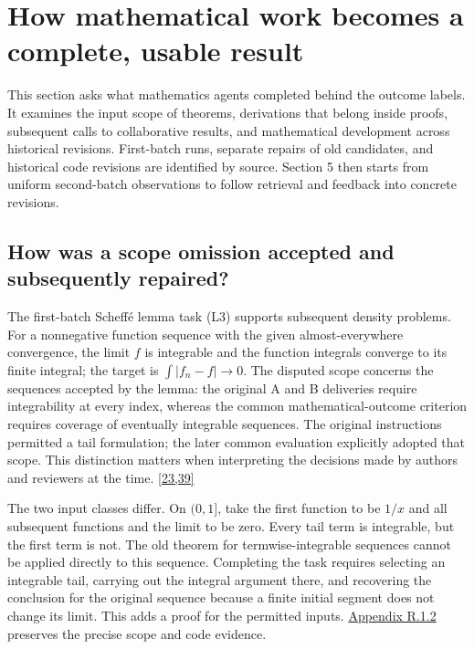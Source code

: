 \section[How mathematical work becomes a complete, usable result]{\texorpdfstring{\protect\hypertarget{section-4}{}How mathematical work becomes a complete, usable result}{How mathematical work becomes a complete, usable result}}
This section asks what mathematics agents completed behind the outcome labels. It examines the input scope of theorems, derivations that belong inside proofs, subsequent calls to collaborative results, and mathematical development across historical revisions. First-batch runs, separate repairs of old candidates, and historical code revisions are identified by source. Section 5 then starts from uniform second-batch observations to follow retrieval and feedback into concrete revisions.

\subsection[How was a scope omission accepted and subsequently repaired?]{\texorpdfstring{\protect\hypertarget{section-4-1}{}How was a scope omission accepted and subsequently repaired?}{How was a scope omission accepted and subsequently repaired?}}
The first-batch Scheffé lemma task (L3) supports subsequent density problems. For a nonnegative function sequence with the given almost-everywhere convergence, the limit $f$ is integrable and the function integrals converge to its finite integral; the target is $\int|f_n-f|\to0$. The disputed scope concerns the sequences accepted by the lemma: the original A and B deliveries require integrability at every index, whereas the common mathematical-outcome criterion requires coverage of eventually integrable sequences. The original instructions permitted a tail formulation; the later common evaluation explicitly adopted that scope. This distinction matters when interpreting the decisions made by authors and reviewers at the time. \hyperlink{ref-23}{\mbox{[23,39]}}

The two input classes differ. On $(0,1]$, take the first function to be $1/x$ and all subsequent functions and the limit to be zero. Every tail term is integrable, but the first term is not. The old theorem for termwise-integrable sequences cannot be applied directly to this sequence. Completing the task requires selecting an integrable tail, carrying out the integral argument there, and recovering the conclusion for the original sequence because a finite initial segment does not change its limit. This adds a proof for the permitted inputs. \href{en-appendix.pdf\#r1-2}{Appendix R.1.2} preserves the precise scope and code evidence.

